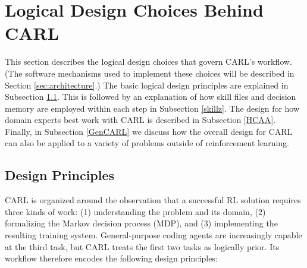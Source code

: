 \documentclass[mnsc,sglanonrev]{informs4}
\begin{document}
\section{Logical Design Choices Behind CARL}
\label{sec:methodology}

This section describes the logical design choices that govern CARL's workflow. (The software mechanisms used to implement these choices will be described in Section \ref{sec:architecture}.) The basic logical design principles are explained in Subsection \ref{DesignPrin}. This is followed by an explanation of how skill files and decision memory are employed within each step in Subsection \ref{skillz}. The design for how domain experts best work with CARL is described in Subsection \ref{HCAA}. Finally, in
Subsection \ref{GenCARL} we discuss how the overall design for CARL can also be applied to a variety of problems outside of reinforcement learning.



\subsection{Design Principles}
\label{DesignPrin}

CARL is organized around the observation that a successful RL solution requires three kinds of work: (1) understanding the problem and its domain, (2) formalizing the Markov decision process (MDP), and (3) implementing the resulting training system. General-purpose coding agents are increasingly capable at the third task, but CARL treats the first two tasks as logically prior. Its workflow therefore encodes the following design principles:
\end{document}
